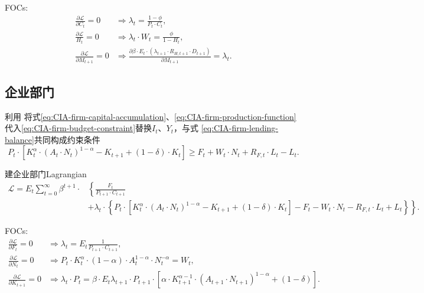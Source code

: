 FOCs:
\begin{align}
  \label{eq:CIA-hh-FOC-C}
  \frac{\partial \mathcal{L}}{\partial C_t} = 0 &\Rightarrow \lambda_t = \frac{1-\phi}{P_t \cdot C_t}, \\
  \label{eq:CIA-hh-FOC-H}
  \frac{\partial \mathcal{L}}{H_t}=0 &\Rightarrow \lambda_t \cdot W_t = \frac{\phi}{1-H_t},\\
  \label{eq:CIA-hh-FOC-M}
  \frac{\partial \mathcal{L}}{\partial M_{t+1}} = 0 &\Rightarrow \frac{\partial \beta \cdot E_t \cdot \left( \lambda_{t+1} \cdot R_{H,t+1} \cdot D_{t+1} \right)}{\partial M_{t+1}} = \lambda_t.
\end{align}

\subsection{企业部门}
利用
将式\eqref{eq:CIA-firm-capital-accumulation}、\eqref{eq:CIA-firm-production-function}
代入\eqref{eq:CIA-firm-budget-constraint}替换$I_t$、$Y_t$，与式  \eqref{eq:CIA-firm-lending-balance}共同构成约束条件
\begin{equation*}
  P_t \cdot \left[
K_t^{\alpha} \cdot \left(A_t \cdot N_t \right)^{1-\alpha} - K_{t+1} + (1-\delta) \cdot K_t
  \right] \ge F_t + W_t \cdot N_t + R_{F,t} \cdot L_t - L_t.
\end{equation*}

建企业部门Lagrangian
\begin{align*}
  \mathcal{L} = E_t \sum_{t=0}^{\infty} \beta^{t+1} \cdot &\left\{ \frac{F_t}{P_{t+1} \cdot C_{t+1}} \right. \\
  &+\left. \lambda_t \cdot \left\{
P_t \cdot \left[ K_t^{\alpha} \cdot \left( A_t \cdot N_t \right)^{1-\alpha} - K_{t+1} + (1-\delta) \cdot K_t \right] - F_t - W_t \cdot N_t - R_{F,t} \cdot L_t + L_t
  \right\} \right\}.
\end{align*}

FOCs:
\begin{align}
  \label{eq:CIA-firm-FOC-F}
  \frac{\partial \mathcal{L}}{\partial F_t} = 0 & \Rightarrow \lambda_t = E_t \frac{1}{P_{t+1} \cdot C_{t+1}}, \\
  \label{eq:CIA-firm-FOC-N}
  \frac{\partial \mathcal{L}}{\partial N_t} = 0 & \Rightarrow P_t \cdot K_{t}^{\alpha} \cdot (1-\alpha) \cdot A_t^{1-\alpha} \cdot N_t^{-\alpha} = W_t,\\
  \label{eq:CIA-firm-FOC-K}
  \frac{\partial \mathcal{L}}{\partial K_{t+1}} = 0 &\Rightarrow \lambda_t \cdot P_t = \beta \cdot E_t \lambda_{t+1} \cdot P_{t+1} \cdot \left[
\alpha \cdot K_{t+1}^{\alpha - 1} \cdot \left( A_{t+1} \cdot N_{t+1} \right)^{1-\alpha} + (1-\delta)
  \right].
\end{align}

